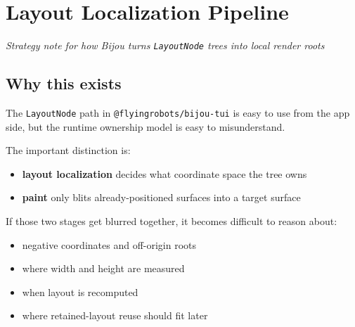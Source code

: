 \chapter{Layout Localization Pipeline}\label{record-049}

\smallskip

\emph{Strategy note for how Bijou turns \texttt{L\allowbreak{}a\allowbreak{}y\allowbreak{}o\allowbreak{}u\allowbreak{}t\allowbreak{}N\allowbreak{}o\allowbreak{}d\allowbreak{}e} trees into local render roots}

\section{Why this exists}\label{record-049-why-this-exists}

The \texttt{L\allowbreak{}a\allowbreak{}y\allowbreak{}o\allowbreak{}u\allowbreak{}t\allowbreak{}N\allowbreak{}o\allowbreak{}d\allowbreak{}e} path in \texttt{@\allowbreak{}f\allowbreak{}l\allowbreak{}y\allowbreak{}i\allowbreak{}n\allowbreak{}g\allowbreak{}r\allowbreak{}o\allowbreak{}b\allowbreak{}o\allowbreak{}t\allowbreak{}s\allowbreak{}/\allowbreak{}b\allowbreak{}i\allowbreak{}j\allowbreak{}o\allowbreak{}u\allowbreak{}-\allowbreak{}t\allowbreak{}u\allowbreak{}i} is easy to use from the app side, but the runtime ownership model is easy to misunderstand.

The important distinction is:

\begin{itemize}
\tightlist
\item
  \textbf{layout localization} decides what coordinate space the tree owns
\item
  \textbf{paint} only blits already-positioned surfaces into a target surface
\end{itemize}

If those two stages get blurred together, it becomes difficult to reason about:

\begin{itemize}
\tightlist
\item
  negative coordinates and off-origin roots
\item
  where width and height are measured
\item
  when layout is recomputed
\item
  where retained-layout reuse should fit later
\end{itemize}

